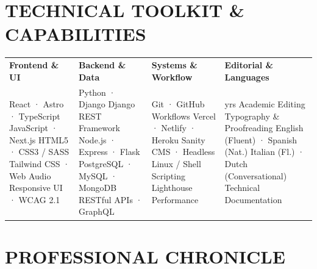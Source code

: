 \documentclass[a4paper]{article}
\begin{document}
\section*{TECHNICAL TOOLKIT \& CAPABILITIES}
\setlength{\tabcolsep}{5pt}
\begin{tabularx}{\textwidth}{@{}>{\hsize=0.96\hsize}X >{\hsize=1.00\hsize}X >{\hsize=0.94\hsize}X >{\hsize=1.10\hsize}X@{}}
  \textbf{\fontsize{8.2}{9.2}\selectfont\color{accent} Frontend \& UI} &
  \textbf{\fontsize{8.2}{9.2}\selectfont\color{accent} Backend \& Data} &
  \textbf{\fontsize{8.2}{9.2}\selectfont\color{accent} Systems \& Workflow} &
  \textbf{\fontsize{8.2}{9.2}\selectfont\color{accent} Editorial \& Languages} \\
  \fontsize{7.5}{9.5}\selectfont
  React · Astro · TypeScript\newline
  JavaScript · Next.js\newline
  HTML5 · CSS3 / SASS\newline
  Tailwind CSS · Web Audio\newline
  Responsive UI · WCAG 2.1
  &
  \fontsize{7.5}{9.5}\selectfont
  Python · Django\newline
  Django REST Framework\newline
  Node.js · Express · Flask\newline
  PostgreSQL · MySQL · MongoDB\newline
  RESTful APIs · GraphQL
  &
  \fontsize{7.5}{9.5}\selectfont
  Git · GitHub Workflows\newline
  Vercel · Netlify · Heroku\newline
  Sanity CMS · Headless\newline
  Linux / Shell Scripting\newline
  Lighthouse Performance
  &
  \fontsize{7.5}{9.5}\selectfont
  17 yrs Academic Editing\newline
  Typography \& Proofreading\newline
  English (Fluent) · Spanish (Nat.)\newline
  Italian (Fl.) · Dutch (Conversational)\newline
  Technical Documentation
\end{tabularx}

\vspace{1pt}

\section*{PROFESSIONAL CHRONICLE}
\end{document}
